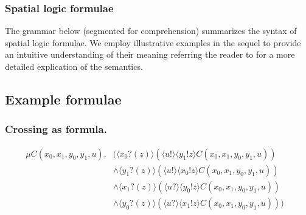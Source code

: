 \subsubsection{Spatial logic formulae}

The grammar below (segmented for comprehension) summarizes the syntax
of spatial logic formulae. We employ illustrative examples in the
sequel to provide an intuitive understanding of their meaning
referring the reader to \cite{Caires04} for a more detailed explication
of the semantics.



\subsection{Example formulae}\label{sub:example_formulae_} %

\subsubsection{Crossing as formula.}
% 

\begin{align*}
 \mu C(x_{0},x_{1},y_{0},y_{1},u).&(\langle x_{0}?(z) \rangle(\langle u! \rangle\langle y_{1}!z \rangle C(x_{0},x_{1},y_{0},y_{1},u)) & \\
  & \wedge \langle y_{1}?(z) \rangle (\langle u! \rangle \langle x_{0}!z \rangle C(x_{0},x_{1},y_{0},y_{1},u)) & \\
  & \wedge \langle x_{1}?(z) \rangle (\langle u? \rangle \langle y_{0}!z \rangle C(x_{0},x_{1},y_{0},y_{1},u)) & \\
  & \wedge \langle y_{0}?(z) \rangle (\langle u? \rangle \langle x_{1}!z \rangle C(x_{0},x_{1},y_{0},y_{1},u))) &
\end{align*}

